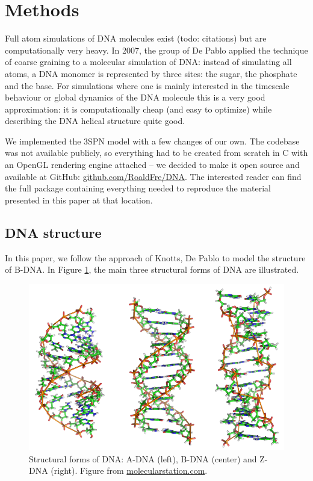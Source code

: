 \section{Methods}

Full atom simulations of DNA molecules exist (todo: citations) but are computationally very heavy. In 2007, the group of De Pablo \cite{knotts2007coarse} applied the technique of coarse graining to a molecular simulation of DNA: instead of simulating all atoms, a DNA monomer is represented by three sites: the sugar, the phosphate and the base. For simulations where one is mainly interested in the timescale behaviour or global dynamics of the DNA molecule this is a very good approximation: it is computationally cheap (and easy to optimize) while describing the DNA helical structure quite good. 

We implemented the 3SPN model with a few changes of our own. The codebase was not available publicly, so everything had to be created from scratch in C with an OpenGL rendering engine attached -- we decided to make it open source and available at GitHub: \href{https://github.com/RoaldFre/DNA}{github.com/RoaldFre/DNA}. The interested reader can find the full package containing everything needed to reproduce the material presented in this paper at that location.

\subsection{DNA structure}

In this paper, we follow the approach of Knotts, De Pablo \etal \cite{knotts2007coarse} to model the structure of B-DNA. In Figure \ref{dna_forms}, the main three structural forms of DNA are illustrated.

\begin{figure}[htbp]
\begin{center}
\includegraphics[width=14cm]{images/dna_forms.png}
\caption{Structural forms of DNA: A-DNA (left), B-DNA (center) and Z-DNA (right). Figure from \href{http://www.molecularstation.com}{molecularstation.com}.}
\label{dna_forms}
\end{center}
\end{figure}


